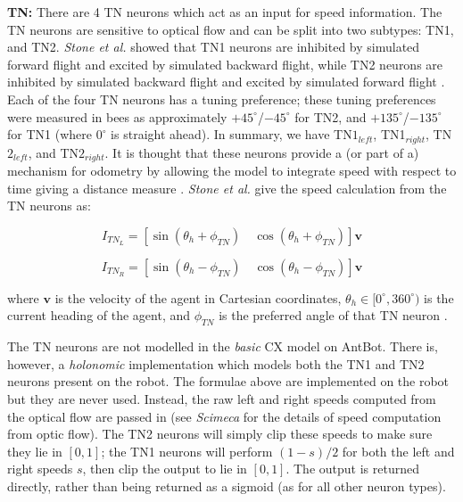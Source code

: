 \documentclass[a4paper,11pt,twoside,openright]{article}
\begin{document}
\textbf{TN:}
There are 4 TN neurons which act as an input for speed information. The TN
neurons are sensitive to optical flow and can be split into two subtypes:
TN1, and TN2. \textit{Stone et al.} showed that TN1 neurons are inhibited by
simulated forward flight and excited by simulated backward flight, while TN2
neurons are inhibited by simulated backward flight and excited by simulated
forward flight \cite{Stone2017}. Each of the four TN neurons has a tuning
preference; these tuning preferences were measured in bees as approximately
$+45^{\circ}$/$-45^{\circ}$ for TN2, and $+135^{\circ}$/$-135^{\circ}$ for TN1
(where $0^{\circ}$ is straight ahead). In summary, we have TN$1_{left}$,
TN1$_{right}$, TN$2_{left}$, and TN$2_{right}$. It is thought that these neurons
provide a (or part of a) mechanism for odometry by allowing the model to
integrate speed with respect to time giving a distance measure \cite{Stone2017}.
\textit{Stone et al.} give the speed calculation from the TN neurons
as:

\begin{equation}
  I_{TN_{L}} =
  [ \sin (\theta_{h} + \phi_{TN}) \quad \cos (\theta_{h} + \phi_{TN}) ]\mathbf{v}
\end{equation}

\begin{equation}
  I_{TN_{R}} =
  [ \sin (\theta_{h} - \phi_{TN}) \quad \cos (\theta_{h} - \phi_{TN}) ]\mathbf{v}
\end{equation}

where $\mathbf{v}$ is the velocity of the agent in Cartesian coordinates,
$\theta_h \in [0^{\circ}, 360^{\circ})$ is the current heading of the agent, and
$\phi_{TN}$ is the preferred angle of that TN neuron \cite{Stone2017}.
\newline
\par

The TN neurons are not modelled in the \textit{basic} CX model on AntBot. There
is, however, a \textit{holonomic} implementation which models both the TN1 and
TN2 neurons present on the robot. The formulae above are implemented on the
robot but they are never used. Instead, the raw left and right speeds computed
from the optical flow are passed in (see \textit{Scimeca} \cite{Scimeca2017} for
the details of speed computation from optic flow). The TN2 neurons will simply
clip these speeds to make sure they lie in $[0,1]$; the TN1 neurons will perform
$(1 - s) / 2$ for both the left and right speeds $s$, then clip the output to lie
in $[0,1]$. The output is returned directly, rather than being returned as a
sigmoid (as for all other neuron types).
\newline
\par
\end{document}
